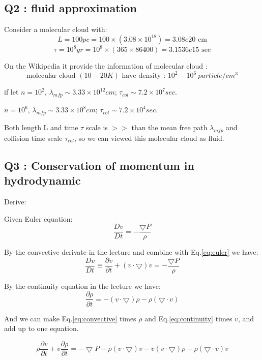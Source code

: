 \documentclass{article}
\begin{document}
\subsection*{Q2 : fluid approximation}
Consider a molecular cloud with:
$$
L=100pc=100\times(3.08\times10^{18})=3.08e20\mbox{ cm}
$$
$$
\tau=10^8yr=10^8\times(365\times86400)=3.1536e15\mbox{ sec}
$$

On the Wikipedia\cite{b1} it provide the information of molecular cloud :
$$
\mbox{molecular cloud  } (10-20K)
\mbox{     have density : }10^2-10^6
\ particle/cm^3
$$

if let $n=10^2$, $\lambda_{mfp}\sim 3.33\times10^{12}cm$; $\tau_{col}\sim 7.2\times10^{7}sec$.

\qquad $n=10^6$, $\lambda_{mfp}\sim 3.33\times10^{8}cm$; $\tau_{col}\sim 7.2\times10^{4}sec$.

Both length L and time $\tau$ scale is $>>$ than the mean free path $\lambda_{mfp}$ and collision time scale $\tau_{col}$, so we can viewed this molecular cloud as fluid.


\subsection*{Q3 : Conservation of momentum in hydrodynamic}
Derive\cite{b2}:

Given Euler equation:
\begin{equation}
    \frac{Dv}{Dt}=-\frac{\bigtriangledown P}{\rho}
    \label{eq:euler}
\end{equation}

By the convective derivate in the lecture and combine with Eq.\ref{eq:euler} we have:
\begin{equation}
    \frac{Dv}{Dt}
    \equiv \frac{\partial v }{\partial t}+(v \cdot \bigtriangledown)v
    =-\frac{\bigtriangledown P}{\rho}
    \label{eq:convective}
\end{equation}

By the continuity equation in the lecture we have:
\begin{equation}
    \frac{\partial \rho}{\partial t}=
    -(v \cdot \bigtriangledown)\rho-\rho(\bigtriangledown \cdot v)
    \label{eq:continuity}
\end{equation}

And we can make Eq.\ref{eq:convective} times $\rho$ and Eq.\ref{eq:continuity} times $v$, and add up to one equation.

\begin{equation}
    \rho \frac{\partial v }{\partial t}
    +v \frac{\partial \rho}{\partial t}
    =
    -\bigtriangledown P
    -\rho (v \cdot \bigtriangledown)v
    -v(v \cdot \bigtriangledown)\rho
    -\rho(\bigtriangledown \cdot v)v    
    \label{eq:combine}
\end{equation}
\end{document}
